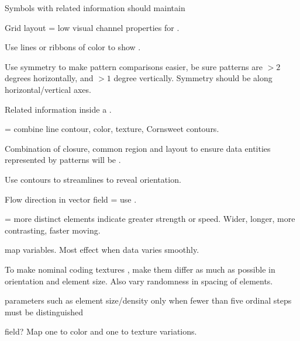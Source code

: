 \begin{compactenum}

    \item Symbols with related information should maintain 

    \item Grid layout = low visual channel properties for .

    \item Use lines or ribbons of color to show .

    \item Use symmetry to make pattern comparisons easier, be sure patterns are
        $>2$ degrees horizontally, and $>1$ degree vertically. Symmetry should
        be along horizontal/vertical axes.

    \item Related information inside a .

    \item {} = combine line contour, color, texture,
        Cornsweet contours.

    \item Combination of closure, common region and layout to ensure
        data entities represented by patterns will be .

    \item Use contours  to streamlines to reveal orientation.

    \item Flow direction in vector field = use .

    \item {} = more distinct elements indicate greater strength or
        speed. Wider, longer, more contrasting, faster moving.

    \item {} map variables. Most effect when data varies
        smoothly.

    \item To make nominal coding textures , make them differ as much as
        possible in orientation and element size. Also vary randomness in
        spacing of elements.

    \item {} parameters such as element size/density only when
        fewer than five ordinal steps must be distinguished

    \item {} field? Map one to color and one to texture
        variations.


\end{compactenum}
